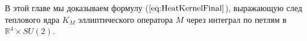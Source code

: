 
В этой главе мы доказываем формулу ($\ref{eq:HeatKernelFinal}$), выражающую след теплового ядра $K_M$ эллиптического оператора $M$ через интеграл по петлям в $\mathbb{R}^4\times SU(2)$.